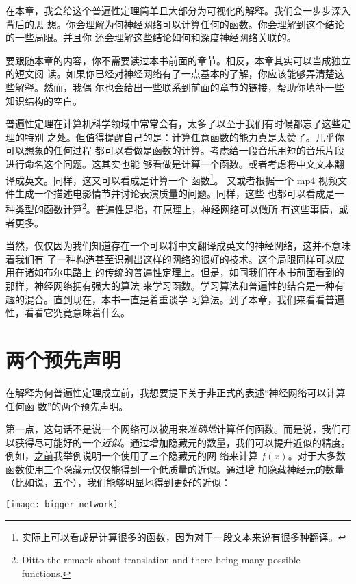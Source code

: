在本章，我会给这个普遍性定理简单且大部分为可视化的解释。我们会一步步深入背后的思
想。你会理解为何神经网络可以计算任何的函数。你会理解到这个结论的一些局限。并且你
还会理解这些结论如何和深度神经网络关联的。

要跟随本章的内容，你不需要读过本书前面的章节。相反，本章其实可以当成独立的短文阅
读。如果你已经对神经网络有了一点基本的了解，你应该能够弄清楚这些解释。然而，我偶
尔也会给出一些联系到前面的章节的链接，帮助你填补一些知识结构的空白。

普遍性定理在计算机科学领域中常常会有，太多了以至于我们有时候都忘了这些定理的特别
之处。但值得提醒自己的是：计算任意函数的能力真是太赞了。几乎你可以想象的任何过程
都可以看做是函数的计算。考虑给一段音乐用短的音乐片段进行命名这个问题。这其实也能
够看做是计算一个函数。或者考虑将中文文本翻译成英文。同样，这又可以看成是计算一个
函数\footnote{实际上可以看成是计算很多的函数，因为对于一段文本来说有很多种翻译。}。
又或者根据一个 mp4 视频文件生成一个描述电影情节并讨论表演质量的问题。同样，这些
也都可以看成是一种类型的函数计算\footnote{Ditto the remark about translation and
  there being many possible functions.}。普遍性是指，在原理上，神经网络可以做所
有这些事情，或者更多。

当然，仅仅因为我们知道存在一个可以将中文翻译成英文的神经网络，这并不意味着我们有
了一种构造甚至识别出这样的网络的很好的技术。这个局限同样可以应用在诸如布尔电路上
的传统的普遍性定理上。但是，如同我们在本书前面看到的那样，神经网络拥有强大的算法
来学习函数。学习算法和普遍性的结合是一种有趣的混合。直到现在，本书一直是着重谈学
习算法。到了本章，我们来看看普遍性，看看它究竟意味着什么。

\section{两个预先声明}
\label{sec:two_caveats}

在解释为何普遍性定理成立前，我想要提下关于非正式的表述“神经网络可以计算任何函
数”的两个预先声明。

第一点，这句话不是说一个网络可以被用来\emph{准确地}计算任何函数。而是说，我们可
以获得尽可能好的一个\emph{近似}。通过增加隐藏元的数量，我们可以提升近似的精度。
例如，\hyperref[basic_network_precursor]{之前}我举例说明一个使用了三个隐藏元的网
络来计算 $f(x)$。对于大多数函数使用三个隐藏元仅仅能得到一个低质量的近似。通过增
加隐藏神经元的数量（比如说，五个），我们能够明显地得到更好的近似：
\begin{center}
  \texttt{[image: bigger\_network]}
\end{center}


